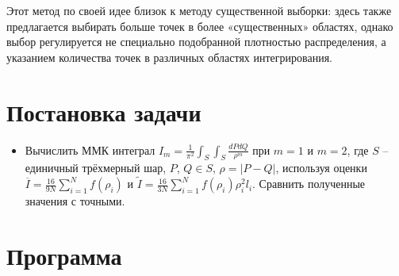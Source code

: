 \documentclass[
11pt,
master, %
subf, %
href, %
colorlinks=true, %
times, %
]{disser}
\begin{document}
Этот метод по своей идее близок к методу существенной выборки: здесь также предлагается выбирать больше точек в более «существенных» областях, однако выбор регулируется не специально подобранной плотностью распределения, а указанием количества точек в различных областях интегрирования.
\newpage
\section{Постановка задачи}
\begin{itemize}
\item Вычислить ММК интеграл $\displaystyle I_m = \frac{1}{\pi^2}\int_S\int_S \frac{dP dQ}{\rho^m}$ при $m=1$ и $m=2$, где $S$ -- единичный трёхмерный шар, $P$, $Q\in S$, $\rho = |P-Q|$, используя оценки $\displaystyle\overline{I} = \frac{16}{9N}\sum_{i=1}^{N}f(\rho_i)$ и $\displaystyle\tilde{I} = \frac{16}{3N}\sum_{i=1}^{N}f(\rho_i)\rho_i^2 l_i$. Сравнить полученные значения с точными.
\end{itemize}

\newpage
\section{Программа}
\end{document}
